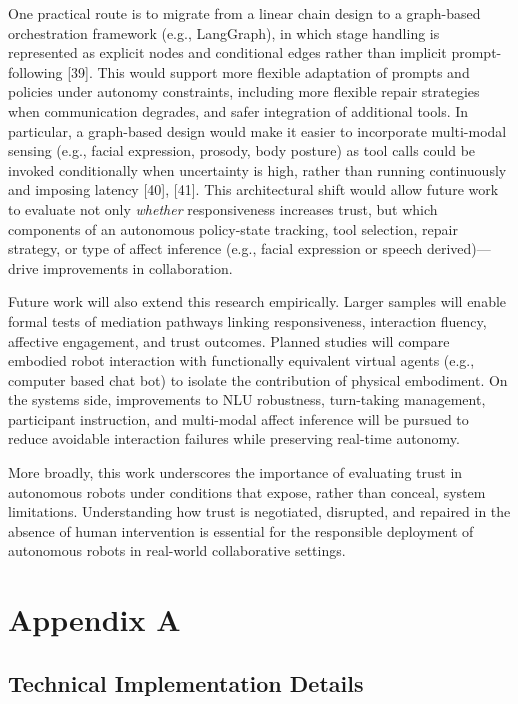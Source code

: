 \documentclass[
  letterpaper,
  DIV=11,
  numbers=noendperiod]{scrartcl}
\begin{document}
One practical route is to migrate from a linear chain design to a
graph-based orchestration framework (e.g., LangGraph), in which stage
handling is represented as explicit nodes and conditional edges rather
than implicit prompt-following {[}39{]}. This would support more
flexible adaptation of prompts and policies under autonomy constraints,
including more flexible repair strategies when communication degrades,
and safer integration of additional tools. In particular, a graph-based
design would make it easier to incorporate multi-modal sensing (e.g.,
facial expression, prosody, body posture) as tool calls could be invoked
conditionally when uncertainty is high, rather than running continuously
and imposing latency {[}40{]}, {[}41{]}. This architectural shift would
allow future work to evaluate not only \emph{whether} responsiveness
increases trust, but which components of an autonomous policy-state
tracking, tool selection, repair strategy, or type of affect inference
(e.g., facial expression or speech derived)---drive improvements in
collaboration.

Future work will also extend this research empirically. Larger samples
will enable formal tests of mediation pathways linking responsiveness,
interaction fluency, affective engagement, and trust outcomes. Planned
studies will compare embodied robot interaction with functionally
equivalent virtual agents (e.g., computer based chat bot) to isolate the
contribution of physical embodiment. On the systems side, improvements
to NLU robustness, turn-taking management, participant instruction, and
multi-modal affect inference will be pursued to reduce avoidable
interaction failures while preserving real-time autonomy.

More broadly, this work underscores the importance of evaluating trust
in autonomous robots under conditions that expose, rather than conceal,
system limitations. Understanding how trust is negotiated, disrupted,
and repaired in the absence of human intervention is essential for the
responsible deployment of autonomous robots in real-world collaborative
settings.

\section{Appendix A}\label{sec-appendix-a}

\subsection{Technical Implementation
Details}\label{technical-implementation-details}
\end{document}
